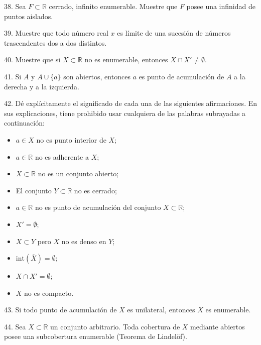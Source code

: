 \documentclass[12pt,oneside]{book}
\begin{document}
38. Sea \( F \subset \mathbb{R} \) cerrado, infinito enumerable. Muestre que \( F \) posee una infinidad de puntos aislados.

39. Muestre que todo número real \( x \) es límite de una sucesión de números trascendentes dos a dos distintos.

40. Muestre que si \( X \subset \mathbb{R} \) no es enumerable, entonces \( X \cap X' \neq \emptyset \).

41. Si \(A\) y \(A \cup \{a\}\) son abiertos, entonces \(a\) es punto de acumulación de \(A\) a la derecha y a la izquierda.

42. Dé explícitamente el significado de cada una de las siguientes afirmaciones. En sus explicaciones, tiene prohibido usar cualquiera de las palabras subrayadas a continuación:
\begin{itemize}
    \item[1)] \(a \in X\) no es punto interior de \(X\);\\
    \item[2)] \(a \in \mathbb{R}\) no es adherente a \(X\);\\
    \item[3)] \(X \subset \mathbb{R}\) no es un conjunto abierto;\\
    \item[4)] El conjunto \(Y \subset \mathbb{R}\) no es cerrado;\\
    \item[5)] \(a \in \mathbb{R}\) no es punto de acumulación del conjunto \(X \subset \mathbb{R}\);\\
    \item[6)] \(X' = \emptyset\);\\
    \item[7)] \(X \subset Y\) pero \(X\) no es denso en \(Y\);\\
    \item[8)] \(\text{int}(\overline{X}) = \emptyset\);\\
    \item[9)] \(X \cap X' = \emptyset\);\\
    \item[10)] \(X\) no es compacto.
\end{itemize}

43. Si todo punto de acumulación de \(X\) es unilateral, entonces \(X\) es enumerable.

44. Sea \(X \subset \mathbb{R}\) un conjunto arbitrario. Toda cobertura de \(X\) mediante abiertos posee una subcobertura enumerable (Teorema de Lindelöf).
\end{document}
